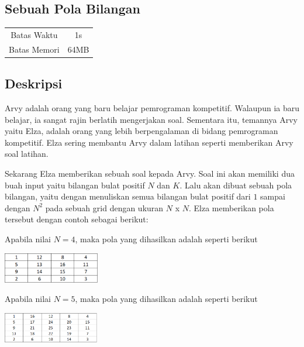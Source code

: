 \documentclass{article}
\begin{document}
\begin{center}
    \section*{Sebuah Pola Bilangan} %

    \begin{tabular}{ | c c | }
        \hline
        Batas Waktu  & 1s \\    %
        Batas Memori & 64MB \\  %
        \hline
    \end{tabular}
\end{center}

\subsection*{Deskripsi}

Arvy adalah orang yang baru belajar pemrograman kompetitif. Walaupun ia  baru belajar, ia sangat rajin berlatih
mengerjakan soal. Sementara itu, temannya Arvy yaitu Elza, adalah orang yang lebih berpengalaman di bidang pemrograman kompetitif. 
Elza sering membantu Arvy dalam latihan seperti memberikan Arvy soal latihan.

Sekarang Elza memberikan sebuah soal kepada Arvy. Soal ini akan memiliki dua buah input yaitu bilangan bulat positif $N$ dan $K$. 
Lalu akan dibuat sebuah pola bilangan, yaitu dengan menuliskan semua bilangan bulat positif dari $1$ sampai dengan $N^2$ pada sebuah 
grid dengan ukuran $N$ x $N$. Elza memberikan pola tersebut dengan contoh sebagai berikut:

Apabila nilai $N = 4$, maka pola yang dihasilkan adalah seperti berikut
\begin{center}
    \includegraphics[height=50px]{n=4}
\end{center}

Apabila nilai $N = 5$, maka pola yang dihasilkan adalah seperti berikut
\begin{center}
    \includegraphics[height=50px]{n=5}
\end{center}
\end{document}
